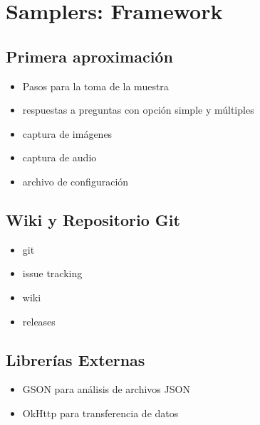 \chapter{Samplers: Framework}
\label{estrategia}

\section{Primera aproximación}
\begin{itemize}
	\item Pasos para la toma de la muestra
	\item respuestas a preguntas con opción simple y múltiples
	\item captura de imágenes
	\item captura de audio
	\item archivo de configuración
\end{itemize}	

\section{Wiki y Repositorio Git}
\begin{itemize}
	\item git
	\item issue tracking 
	\item wiki
	\item releases
\end{itemize}	

\section{Librerías Externas}
\begin{itemize}
	\item GSON para análisis de archivos JSON
	\item OkHttp para transferencia de datos
\end{itemize}	


